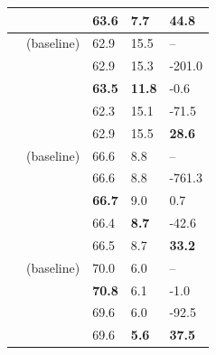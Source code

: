 \begin{table}[!t]
\begin{tabularx}{0.99\textwidth}{AM|TTT}
        &  \ourmethodshort{} &  63.6 &  \bfseries 7.7 &  \bfseries 44.8 \\
        \midrule
        & \lora{} (baseline) & 62.9 & 15.5 & -- \\
        & \dora{} & 62.9 & 15.3 & -201.0 \\
        & \pissa{} & \bfseries 63.5 & \bfseries 11.8 & -0.6 \\
        & \adalora{} & 62.3 & 15.1 & -71.5 \\
        &  \ourmethodshort{} &  62.9 &  15.5 &  \bfseries 28.6 \\
        \midrule
        & \lora{} (baseline) & 66.6 & 8.8 & -- \\
        & \dora{} & 66.6 & 8.8 & -761.3 \\
        & \pissa{} & \bfseries 66.7 & 9.0 & 0.7 \\
        & \adalora{} & 66.4 & \bfseries 8.7 & -42.6 \\
        &  \ourmethodshort{} &  66.5 &  8.7 &  \bfseries 33.2 \\
        \midrule
        & \lora{} (baseline) & 70.0 & 6.0 & -- \\
        & \pissa{} & \bfseries 70.8 & 6.1 & -1.0 \\
        & \adalora{} & 69.6 & 6.0 & -92.5 \\
        &  \ourmethodshort{} &  69.6 &  \bfseries 5.6 &  \bfseries 37.5 \\
        \bottomrule
    \end{tabularx}
    \label{tab:quality_1}
\end{table}